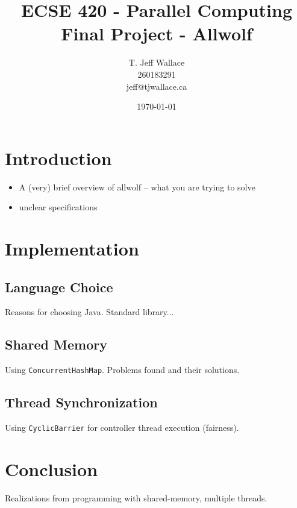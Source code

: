 \documentclass[pdftex,10pt]{article}
\begin{document}
\title{ECSE 420 - Parallel Computing \\ Final Project - Allwolf}
\author{T. Jeff Wallace \\ 260183291 \\ jeff@tjwallace.ca}
\date{\today}
\maketitle
\clearpage

\tableofcontents
\lstlistoflistings
\clearpage


\section{Introduction}\label{intro}
\begin{itemize}
	\item A (very) brief overview of allwolf -- what you are trying to solve
	\item unclear specifications
\end{itemize}

\section{Implementation}\label{impl}
\subsection{Language Choice}\label{language}
Reasons for choosing Java.  Standard library...

\subsection{Shared Memory}\label{sharedMemory}
Using {\tt ConcurrentHashMap}.  Problems found and their solutions.

\subsection{Thread Synchronization}\label{threadSync}
Using {\tt CyclicBarrier} for controller thread execution (fairness).

\section{Conclusion}\label{conclusion}
Realizations from programming with shared-memory, multiple threads.
\end{document}
